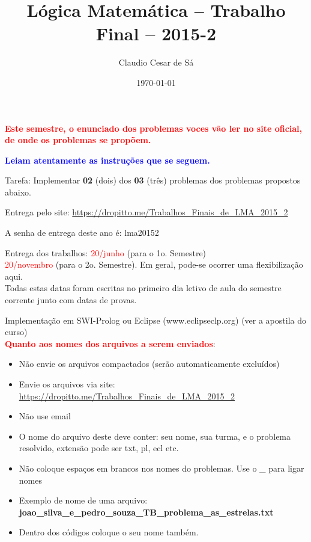 \documentclass[a4paper,12pt]{article}
\title{Lógica Matemática -- Trabalho Final -- 2015-2}
\author{Claudio Cesar de Sá}
\date{\today}
\begin{document}
\maketitle

\begin{flushleft}





\vspace{0.5cm}
  {\bf \textcolor{red}{Este semestre, o enunciado dos problemas voces vão ler no site oficial, de onde os problemas se propõem.}}


\vspace{0.5cm}
 {\bf \textcolor{blue}{Leiam atentamente as
instruções que se seguem.}}


\vspace{0.5cm}
 Tarefa: Implementar \textbf{02} (dois) dos  \textbf{03} (três)  problemas dos problemas propostos abaixo.


\vspace{0.5cm}
 Entrega pelo site: \textcolor{red}{\url{https://dropitto.me/Trabalhos_Finais_de_LMA_2015_2}}

\vspace{0.5cm}
 A senha de entrega deste ano é: lma20152

\vspace{0.5cm}
 Entrega dos trabalhos: \textcolor{red}{20/junho} (para o 1o. Semestre)\\
\textcolor{red}{20/novembro} (para o 2o. Semestre). Em geral, pode-se
ocorrer uma flexibilização aqui.\\

\vspace{0.5cm}
 Todas estas datas foram escritas no primeiro dia letivo de aula
do semestre corrente junto com datas de provas.


\vspace{0.5cm}
 Implementação em SWI-Prolog ou Eclipse (www.eclipseclp.org) (ver a apostila do curso)\\

\vspace{0.5cm}
 \textcolor{red}{\textbf{Quanto aos nomes dos arquivos a serem enviados}}:
\begin{itemize}
  \item Não envie os arquivos compactados (serão automaticamente excluídos)
  \item Envie os arquivos  via site: \url{https://dropitto.me/Trabalhos_Finais_de_LMA_2015_2}
  \item Não use email
  \item O nome do arquivo deste deve conter: seu nome,
  sua turma, e o problema resolvido, extensão pode ser txt, pl, ecl etc.
  \item Não coloque espaços em brancos nos nomes do problemas. Use o \_ para ligar nomes
  \item Exemplo de nome de uma arquivo:  \textbf{joao\_silva\_e\_pedro\_souza\_TB\_problema\_as\_estrelas.txt}
  \item Dentro dos códigos coloque o seu nome também.
\end{itemize}



\end{flushleft}
\end{document}
